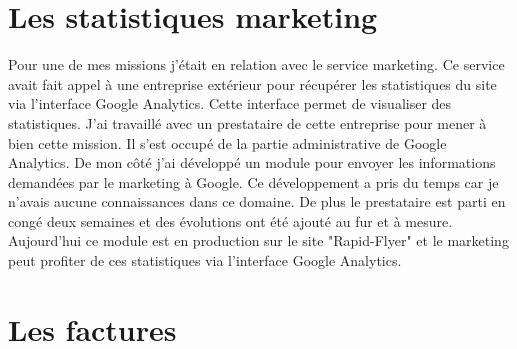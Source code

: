 \section{Les statistiques marketing}
Pour une de mes missions j'était en relation avec le service marketing. Ce service avait fait appel à une entreprise extérieur pour récupérer les statistiques du site via l'interface Google Analytics. Cette interface permet de visualiser des statistiques.\newline
J'ai travaillé avec un prestataire de cette entreprise pour mener à bien cette mission. Il s'est occupé de la partie administrative de Google Analytics. De mon côté j'ai développé un module pour envoyer les informations demandées par le marketing à Google. Ce développement a pris du temps car je n'avais aucune connaissances dans ce domaine. De plus le prestataire est parti en congé deux semaines et des évolutions ont été ajouté au fur et à mesure. Aujourd'hui ce module est en production sur le site "Rapid-Flyer" et le marketing peut profiter de ces statistiques via l'interface Google Analytics.

\section{Les factures}